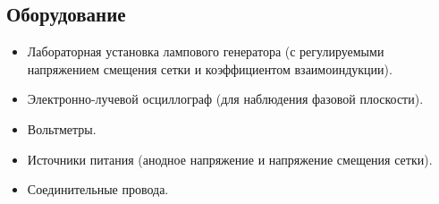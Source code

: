 \subsection*{Оборудование} 

\begin{itemize}
	\item Лабораторная установка лампового генератора (с регулируемыми напряжением смещения сетки и коэффициентом взаимоиндукции).
	\item Электронно-лучевой осциллограф (для наблюдения фазовой плоскости).
	\item Вольтметры.
	\item Источники питания (анодное напряжение и напряжение смещения сетки).
	\item Соединительные провода.
\end{itemize}
